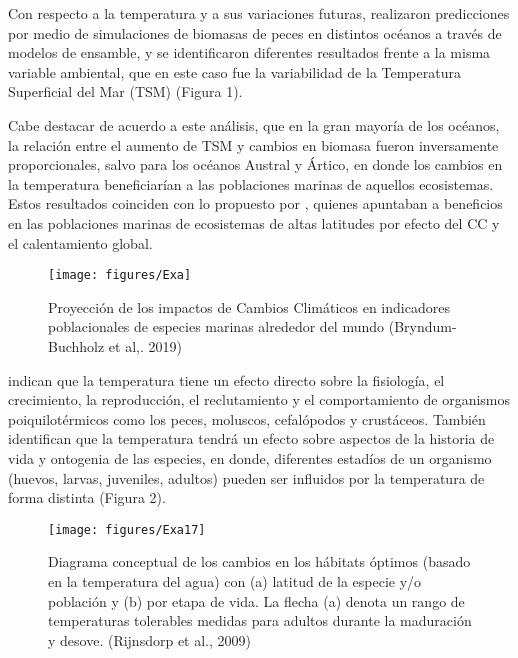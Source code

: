 \documentclass{sydneythesis}
\begin{document}
Con respecto a la temperatura y a sus variaciones futuras, \autocite{Bryndum-Buchholz2019} realizaron predicciones por medio de simulaciones de biomasas de peces en distintos océanos a través de modelos de ensamble, y se identificaron diferentes resultados frente a la misma variable ambiental, que en este caso fue la variabilidad de la Temperatura Superficial del Mar (TSM) (Figura 1).

Cabe destacar de acuerdo a este análisis, que en la gran mayoría de los océanos, la relación entre el aumento de TSM y cambios en biomasa fueron inversamente proporcionales, salvo para los océanos Austral y Ártico, en donde los cambios en la temperatura beneficiarían a las poblaciones marinas de aquellos ecosistemas. Estos resultados coinciden con lo propuesto por \autocite{Koenigstein2016}, quienes apuntaban a beneficios en las poblaciones marinas de ecosistemas de altas latitudes por efecto del CC y el calentamiento global.

\pagebreak

\begin{figure}

{\centering \texttt{[image: figures/Exa]} 

}

\caption{Proyección de los impactos de Cambios Climáticos en indicadores poblacionales de especies marinas alrededor del mundo (Bryndum-Buchholz et al,. 2019)}\label{fig:unnamed-chunk-1}
\end{figure}

\autocite{Rijnsdorp2009} indican que la temperatura tiene un efecto directo sobre la fisiología, el crecimiento, la reproducción, el reclutamiento y el comportamiento de organismos poiquilotérmicos como los peces, moluscos, cefalópodos y crustáceos. También identifican que la temperatura tendrá un efecto sobre aspectos de la historia de vida y ontogenia de las especies, en donde, diferentes estadíos de un organismo (huevos, larvas, juveniles, adultos) pueden ser influidos por la temperatura de forma distinta (Figura 2).

\pagebreak

\begin{figure}

{\centering \texttt{[image: figures/Exa17]} 

}

\caption{Diagrama conceptual de los cambios en los hábitats óptimos (basado en la temperatura del agua) con (a) latitud de la especie y/o población y (b) por etapa de vida. La flecha (a) denota un rango de temperaturas tolerables medidas para adultos durante la maduración y desove. (Rijnsdorp et al., 2009)}\label{fig:unnamed-chunk-2}
\end{figure}
\end{document}
